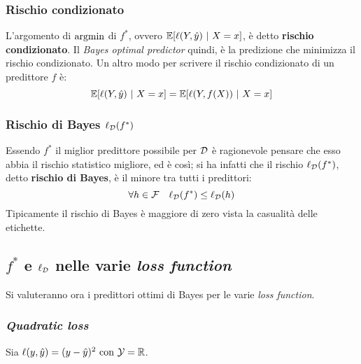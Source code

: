 \subsubsection{Rischio condizionato}
L'argomento di $\operatorname*{argmin}$ di $f^*$, ovvero $\mathbb{E}[\ell(Y,\hat{y})\ | \ X=x]$, è detto
\textbf{rischio condizionato}. Il \textit{Bayes optimal predictor} quindi, è la 
predizione che minimizza il rischio condizionato. Un altro modo per scrivere il
rischio condizionato di un predittore $f$ è:
$$ \mathbb{E}[\ell(Y,\hat{y})\ | \ X=x] = \mathbb{E}[\ell(Y,f(X))\ | \ X=x] $$

\subsubsection{Rischio di Bayes \texorpdfstring{$\ell_{\mathcal{D}}(f^*)$}{lDF*}}
Essendo $f^*$ il miglior predittore possibile per $\mathcal{D}$ è ragionevole pensare che
esso abbia il rischio statistico migliore, ed è così; si ha infatti che il rischio 
$\ell_{\mathcal{D}}(f^*)$, detto \textbf{rischio di Bayes}, è il minore tra tutti i
predittori:
$$ \forall h \in \mathcal{F} \quad \ell_{\mathcal{D}}(f^*) \leq \ell_{\mathcal{D}}(h) $$
Tipicamente il rischio di Bayes è maggiore di zero vista la casualità delle
etichette.

\subsection{
    \texorpdfstring{$f^*$}{f*} e \texorpdfstring{$\ell_{\mathcal{D}}$}{lD*} nelle varie
    \textit{loss function}
}
Si valuteranno ora i predittori ottimi di Bayes per le varie \textit{loss function}.
\subsubsection{\textit{Quadratic loss}}

Sia $\ell(y,\hat{y}) = (y-\hat{y})^2 \ \text{con } \Y = \RN $.

